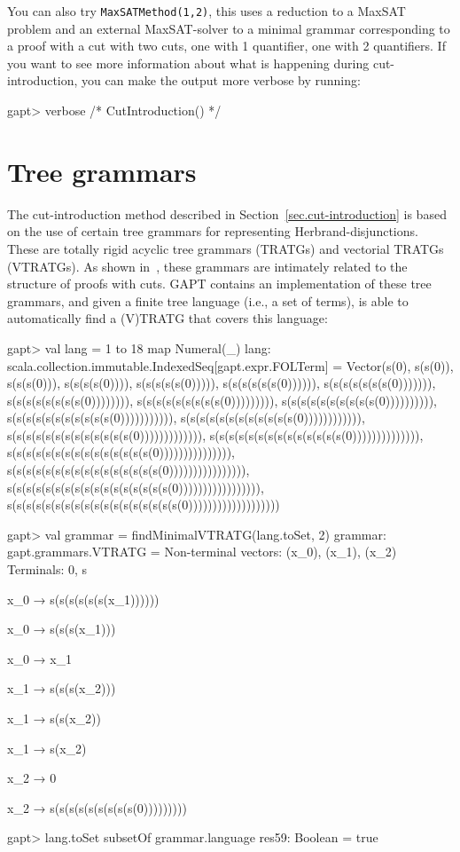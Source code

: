 \documentclass[a4paper,11pt]{book}
\begin{document}
You can also try \texttt{MaxSATMethod(1,2)}, this uses a reduction to a MaxSAT
problem and an external MaxSAT-solver to a
minimal grammar corresponding to a proof with a cut with two cuts, one with 1
quantifier, one with 2 quantifiers.  If you want to see more information
about what is happening during cut-introduction, you can make the output more
verbose by running:

\begin{clilisting}
gapt> verbose { /* CutIntroduction() */ }

\end{clilisting}

\section{Tree grammars}

The cut-introduction method described in Section~\ref{sec.cut-introduction} is
based on the use of certain tree grammars for representing Herbrand-disjunctions.
These are totally rigid acyclic tree grammars (TRATGs) and vectorial TRATGs (VTRATGs).
As shown in~\cite{Hetzl14Algorithmic}, these grammars are intimately related to
the structure of proofs with cuts.  GAPT contains an implementation of
these tree grammars, and given a finite tree language (i.e., a set of terms), is
able to automatically find a (V)TRATG that covers this language:

\begin{clilisting}
gapt> val lang = 1 to 18 map { Numeral(_) }
lang: scala.collection.immutable.IndexedSeq[gapt.expr.FOLTerm] = Vector(s(0), s(s(0)), s(s(s(0))), s(s(s(s(0)))), s(s(s(s(s(0))))), s(s(s(s(s(s(0)))))), s(s(s(s(s(s(s(0))))))), s(s(s(s(s(s(s(s(0)))))))), s(s(s(s(s(s(s(s(s(0))))))))), s(s(s(s(s(s(s(s(s(s(0)))))))))), s(s(s(s(s(s(s(s(s(s(s(0))))))))))), s(s(s(s(s(s(s(s(s(s(s(s(0)))))))))))), s(s(s(s(s(s(s(s(s(s(s(s(s(0))))))))))))), s(s(s(s(s(s(s(s(s(s(s(s(s(s(0)))))))))))))), s(s(s(s(s(s(s(s(s(s(s(s(s(s(s(0))))))))))))))), s(s(s(s(s(s(s(s(s(s(s(s(s(s(s(s(0)))))))))))))))), s(s(s(s(s(s(s(s(s(s(s(s(s(s(s(s(s(0))))))))))))))))), s(s(s(s(s(s(s(s(s(s(s(s(s(s(s(s(s(s(0)))))))))))))))))))

gapt> val grammar = findMinimalVTRATG(lang.toSet, 2)
grammar: gapt.grammars.VTRATG =
Non-terminal vectors: (x_0), (x_1), (x_2)
Terminals: 0, s

x_0 → s(s(s(s(s(s(x_1))))))

x_0 → s(s(s(x_1)))

x_0 → x_1

x_1 → s(s(s(x_2)))

x_1 → s(s(x_2))

x_1 → s(x_2)

x_2 → 0

x_2 → s(s(s(s(s(s(s(s(s(0)))))))))

gapt> lang.toSet subsetOf grammar.language
res59: Boolean = true

\end{clilisting}
\end{document}
